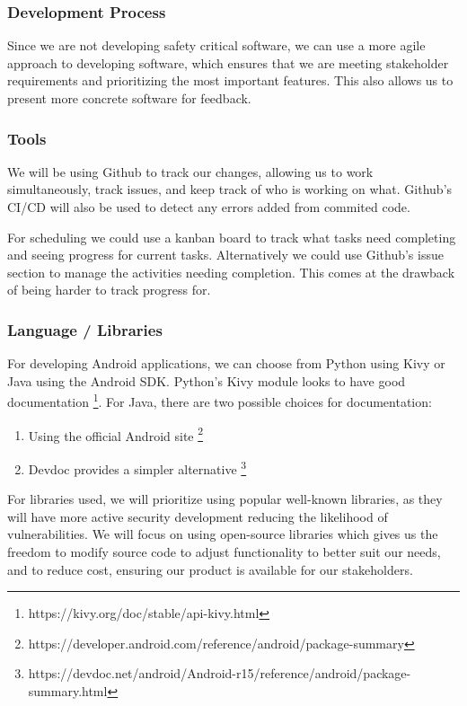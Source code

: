 \subsubsection{Development Process}
Since we are not developing safety critical software, we can use a more agile approach
to developing software, which ensures that we are meeting stakeholder requirements and prioritizing
the most important features. This also allows us to present more concrete software for feedback.
\par 

\subsubsection{Tools}
We will be using Github to track our changes, allowing us to work simultaneously, 
track issues, and keep track of who is working on what. 
Github's CI/CD will also be used to detect any errors added from commited code.
\par
For scheduling we could use a kanban board to track what tasks need completing and seeing
progress for current tasks. Alternatively we could use Github's issue section to manage
the activities needing completion. This comes at the drawback of being harder to track progress
for.
\subsubsection{Language / Libraries}

For developing Android applications, we can choose from Python using Kivy or Java using the Android SDK.
Python's Kivy module looks to have good documentation
\footnote{https://kivy.org/doc/stable/api-kivy.html}.
For Java, there are two possible choices for documentation:
\begin{enumerate}
  \item Using the official Android site
    \footnote{https://developer.android.com/reference/android/package-summary}
  \item Devdoc provides a simpler alternative
    \footnote{https://devdoc.net/android/Android-r15/reference/android/package-summary.html}
\end{enumerate}
\par
For libraries used, we will prioritize using popular well-known libraries, as they will have more
active security development reducing the likelihood of vulnerabilities. We will focus on using
open-source libraries which gives us the freedom to modify source code to adjust functionality to
better suit our needs, and to reduce cost, ensuring our product is available for our stakeholders.

